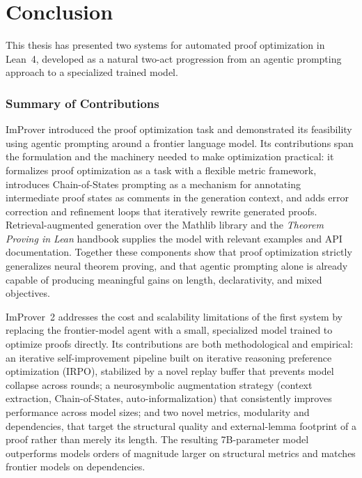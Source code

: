 \chapter{Conclusion}\label{chap:conclusion}

\setlength{\parindent}{1em}

This thesis has presented two systems for automated proof optimization in Lean~4, developed as a natural two-act progression from an agentic prompting approach to a specialized trained model.

\subsection{Summary of Contributions}

ImProver introduced the proof optimization task and demonstrated its feasibility using agentic prompting around a frontier language model. Its contributions span the formulation and the machinery needed to make optimization practical: it formalizes proof optimization as a task with a flexible metric framework, introduces Chain-of-States prompting as a mechanism for annotating intermediate proof states as comments in the generation context, and adds error correction and refinement loops that iteratively rewrite generated proofs. Retrieval-augmented generation over the Mathlib library and the \textit{Theorem Proving in Lean} handbook supplies the model with relevant examples and API documentation. Together these components show that proof optimization strictly generalizes neural theorem proving, and that agentic prompting alone is already capable of producing meaningful gains on length, declarativity, and mixed objectives.

ImProver~2 addresses the cost and scalability limitations of the first system by replacing the frontier-model agent with a small, specialized model trained to optimize proofs directly. Its contributions are both methodological and empirical: an iterative self-improvement pipeline built on iterative reasoning preference optimization (IRPO), stabilized by a novel replay buffer that prevents model collapse across rounds; a neurosymbolic augmentation strategy (context extraction, Chain-of-States, auto-informalization) that consistently improves performance across model sizes; and two novel metrics, modularity and dependencies, that target the structural quality and external-lemma footprint of a proof rather than merely its length. The resulting 7B-parameter model outperforms models orders of magnitude larger on structural metrics and matches frontier models on dependencies.

